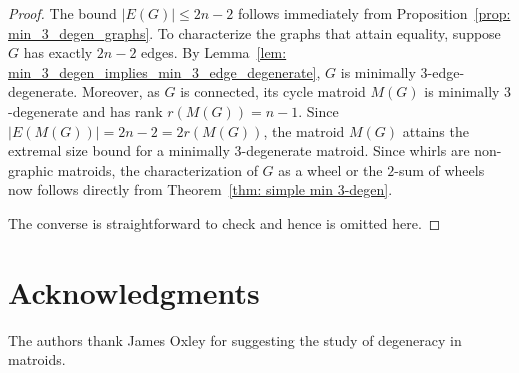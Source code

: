\documentclass{amsart}
\theoremstyle{definition}
\theoremstyle{remark}
\numberwithin{equation}{section}
\begin{document}
\begin{proof}
The bound $|E(G)| \le 2n-2$ follows immediately from Proposition~\ref{prop: min_3_degen_graphs}. To characterize the graphs that attain equality, suppose $G$ has exactly $2n-2$ edges. By Lemma~\ref{lem: min_3_degen_implies_min_3_edge_degenerate}, $G$ is minimally $3$-edge-degenerate. Moreover, as $G$ is connected, its cycle matroid $M(G)$ is minimally $3$-degenerate and has rank $r(M(G)) = n-1$. Since $|E(M(G))| = 2n-2 = 2r(M(G))$, the matroid $M(G)$ attains the extremal size bound for a minimally $3$-degenerate matroid. Since whirls are non-graphic matroids, the characterization of $G$ as a wheel or the $2$-sum of wheels now follows directly from Theorem~\ref{thm: simple min 3-degen}. 

The converse is straightforward to check and hence is omitted here.
\end{proof}

\section*{Acknowledgments}

The authors thank James Oxley for suggesting the study of degeneracy in matroids. 
\end{document}
